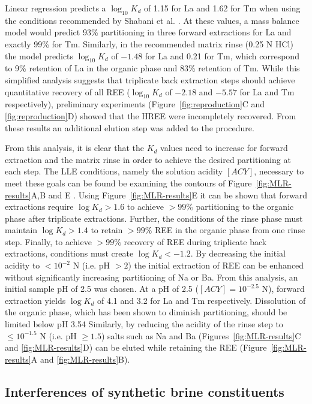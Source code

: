 Linear regression predicts a $\log_{10} K_d$ of 1.15 for La and 1.62 for Tm when using the conditions recommended by Shabani et al. \citep{Shabani_AC_1990}.
At these values, a mass balance model would predict 93\% partitioning in three forward extractions for La and exactly 99\% for Tm.
Similarly, in the recommended matrix rinse (0.25 N HCl) the model predicts $\log_{10} K_d$ of $-1.48$ for La and 0.21 for Tm, which correspond to 9\% retention of La in the organic phase and 83\% retention of Tm.
While this simplified analysis suggests that triplicate back extraction steps should achieve quantitative recovery of all REE ($\log_{10} K_d$ of $-2.18$ and $-5.57$ for La and Tm respectively), preliminary experiments (Figure~\ref{fig:reproduction}C and \ref{fig:reproduction}D) showed that the HREE were incompletely recovered. From these results an additional elution step was added to the procedure. 

From this analysis, it is clear that the $K_d$ values need to increase for forward extraction and the matrix rinse in order to achieve the desired partitioning at each step.
The LLE conditions, namely the solution acidity $[ACY]$, necessary to meet these goals can be found be examining the contours of Figure~\ref{fig:MLR-results}A,B and E .
Using Figure~\ref{fig:MLR-results}E it can be shown that forward extractions require $\log K_d>1.6$ to achieve $>99\%$ partitioning to the organic phase after triplicate extractions. Further, the conditions of the rinse phase must maintain $\log K_d>1.4$  to retain $>99\%$ REE in the organic phase from one rinse step. Finally, to achieve $>99\%$ recovery of REE during triplicate back extractions, conditions must create $\log K_d<-1.2$.
By decreasing the initial acidity to $<10^{-2}$ N (i.e. pH $>2$) the initial extraction of REE can be enhanced without significantly increasing partitioning of Na or Ba. From this analysis, an initial sample pH of 2.5 was chosen.
At a pH of 2.5 ($[ACY] = 10^{-2.5}$ N), forward extraction yields $\log K_d$ of 4.1 and 3.2 for La and Tm respectively.
Dissolution of the organic phase, which has been shown to diminish partitioning, should be limited below pH 3.54
Similarly, by reducing the acidity of the rinse step to $\leq10^{-1.5}$ N (i.e. pH $\geq1.5$) salts such as Na and Ba (Figures~\ref{fig:MLR-results}C and \ref{fig:MLR-results}D) can be eluted while retaining the REE (Figure~\ref{fig:MLR-results}A and \ref{fig:MLR-results}B).

\subsection{Interferences of synthetic brine constituents}

